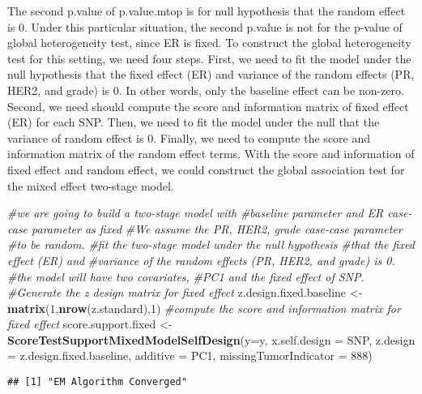 \documentclass[11pt,]{article}
\newenvironment{Shaded}{\begin{snugshade}}{\end{snugshade}}
\newcommand{\KeywordTok}[1]{\textcolor[rgb]{0.13,0.29,0.53}{\textbf{#1}}}
\newcommand{\DataTypeTok}[1]{\textcolor[rgb]{0.13,0.29,0.53}{#1}}
\newcommand{\DecValTok}[1]{\textcolor[rgb]{0.00,0.00,0.81}{#1}}
\newcommand{\StringTok}[1]{\textcolor[rgb]{0.31,0.60,0.02}{#1}}
\newcommand{\CommentTok}[1]{\textcolor[rgb]{0.56,0.35,0.01}{\textit{#1}}}
\newcommand{\NormalTok}[1]{#1}
\begin{document}
The second p.value of p.value.mtop is for null hypothesis that the
random effect is 0. Under this particular situation, the second p.value
is not for the p-value of global heterogeneity test, since ER is fixed.
To construct the global heterogeneity test for this setting, we need
four steps. First, we need to fit the model under the null hypothesis
that the fixed effect (ER) and variance of the random effects (PR, HER2,
and grade) is 0. In other words, only the baseline effect can be
non-zero. Second, we need should compute the score and information
matrix of fixed effect (ER) for each SNP. Then, we need to fit the model
under the null that the variance of random effect is 0. Finally, we need
to compute the score and information matrix of the random effect terms.
With the score and information of fixed effect and random effect, we
could construct the global association test for the mixed effect
two-stage model.

\begin{Shaded}
\begin{Highlighting}[]
\CommentTok{#we are going to build a two-stage model with }
\CommentTok{#baseline parameter and ER case-case parameter as fixed}
\CommentTok{#We assume the PR, HER2, grade case-case parameter }
\CommentTok{#to be random.}
\CommentTok{#fit the two-stage model under the null hypothesis}
\CommentTok{#that the fixed effect (ER) and }
\CommentTok{#variance of the random effects (PR, HER2, and grade) is 0.}
\CommentTok{#the model will have two covariates, }
\CommentTok{#PC1 and the fixed effect of SNP.}
\CommentTok{#Generate the z design matrix for fixed effect}
\NormalTok{z.design.fixed.baseline <-}\StringTok{ }\KeywordTok{matrix}\NormalTok{(}\DecValTok{1}\NormalTok{,}\KeywordTok{nrow}\NormalTok{(z.standard),}\DecValTok{1}\NormalTok{)}
\CommentTok{#compute the score and information matrix for fixed effect}
\NormalTok{score.support.fixed <-}\StringTok{ }\KeywordTok{ScoreTestSupportMixedModelSelfDesign}\NormalTok{(}\DataTypeTok{y=}\NormalTok{y,}
                        \DataTypeTok{x.self.design  =}\NormalTok{ SNP,}
                        \DataTypeTok{z.design =}\NormalTok{ z.design.fixed.baseline,}
                        \DataTypeTok{additive =}\NormalTok{ PC1,}
                        \DataTypeTok{missingTumorIndicator =} \DecValTok{888}\NormalTok{)}
\end{Highlighting}
\end{Shaded}

\begin{verbatim}
## [1] "EM Algorithm Converged"
\end{verbatim}
\end{document}
